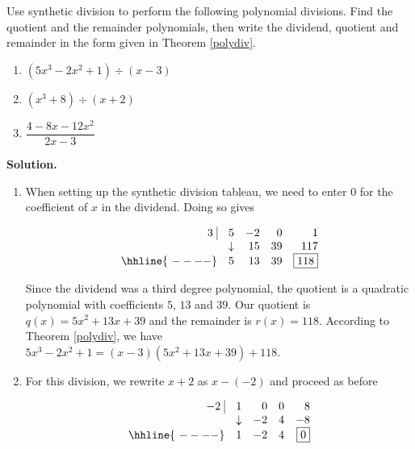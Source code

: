 \begin{ex}  Use synthetic division to perform the following polynomial divisions.  Find the quotient and the remainder polynomials, then write the dividend, quotient and remainder in the form given in Theorem \ref{polydiv}.

\begin{multicols}{3}
\begin{enumerate}

\item  $\left(5x^3 - 2x^2 + 1\right) \div (x-3)$ 
\item  $\left(x^3+8\right) \div (x+2)$ 
\item  $\dfrac{4-8x-12x^2}{2x-3}$

\end{enumerate}
\end{multicols}

{ \bf Solution.} 

\begin{enumerate}


\item When setting up the synthetic division tableau, we need to enter $0$ for the coefficient of $x$ in the dividend.  Doing so gives


\[ \begin{array}{rrrrr}


  3 \, \, \vline& 5 & -2 & 0  & 1 \\

   & \downarrow &  15  &  39  & 117 \\ \hhline{~----} 
  & 5  &   13  & 39  &  \fbox{$118$}  \\  
\end{array}\]

Since the dividend was a third degree polynomial, the quotient is a quadratic polynomial with coefficients $5$, $13$ and $39$.  Our quotient is $q(x) = 5x^2+13x+39$ and the remainder is $r(x) = 118$.  According to Theorem \ref{polydiv}, we have $5x^3 - 2x^2 + 1 = (x-3)\left(5x^2+13x+39 \right) + 118$.

\item  For this division, we rewrite $x+2$ as $x-(-2)$ and proceed as before

\[ \begin{array}{rrrrr}


  -2 \, \, \vline& 1 & 0 & 0  & 8 \\

   & \downarrow &  -2  &  4  & -8 \\ \hhline{~----} 
  & 1  &   -2  & 4  &  \fbox{$0$}  \\  
\end{array}\]


\end{enumerate}
\end{ex}
